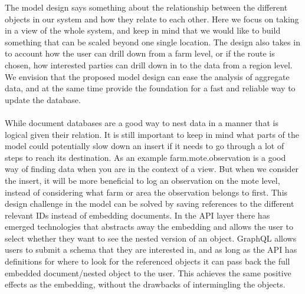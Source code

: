 \documentclass[]{uiophd}
\begin{document}
The model design says something about the relationship between the different objects in our system and how they relate to each other. Here we focus on taking in a view of the whole system, and keep in mind that we would like to build something that can be scaled beyond one single location. The design also takes in to account how the user can drill down from a farm level, or if the route is chosen, how interested parties can drill down in to the data from a region level. We envision that the proposed model design can ease the analysis of aggregate data, and at the same time provide the foundation for a fast and reliable way to update the database.
\\\\
While document databases are a good way to nest data in a manner that is logical given their relation. It is still important to keep in  mind what parts of the model could potentially slow down an insert if it needs to go through a lot of steps to reach its destination. As an example farm.mote.observation is a good way of finding data when you are in the context of a view. But when we consider the insert, it will be more beneficial to log an observation on the mote level, instead of considering what farm or area the observation belongs to first. This design challenge in the model can be solved by saving references to the different relevant IDs instead of embedding documents. In the API layer there has emerged technologies that abstracts away the embedding and allows the user to select whether they want to see the nested version of an object. GraphQL allows users to submit a schema that they are interested in, and as long as the API has definitions for where to look for the referenced objects it can pass back the full embedded document/nested object to the user. This achieves the same positive effects as the embedding, without the drawbacks of intermingling the objects.
\end{document}
